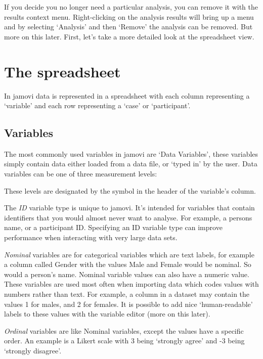 If you decide you no longer need a particular analysis, you can remove it with the results context menu. Right-clicking on the analysis results will bring up a menu and by selecting ‘Analysis’ and then ‘Remove’ the analysis can be removed. But more on this later. First, let's take a more detailed look at the spreadsheet view.


\section{The spreadsheet\label{sec:spreadsheet}}

In jamovi data is represented in a spreadsheet with each column representing a ‘variable’ and each row representing a ‘case’ or ‘participant’.

\subsection{Variables}

The most commonly used variables in jamovi are ‘Data Variables’, these variables simply contain data either loaded from a data file, or ‘typed in’ by the user. Data variables can be one of three measurement levels:

\begin{figure}[ht]
\end{figure}

These levels are designated by the symbol in the header of the variable’s column.

The {\it ID} variable type is unique to jamovi. It’s intended for variables that contain identifiers that you would almost never want to analyse. For example, a persons name, or a participant ID. Specifying an ID variable type can improve performance when interacting with very large data sets.

{\it Nominal} variables are for categorical variables which are text labels, for example a column called Gender with the values Male and Female would be nominal. So would a person’s name. Nominal variable values can also have a numeric value. These variables are used most often when importing data which codes values with numbers rather than text. For example, a column in a dataset may contain the values 1 for males, and 2 for females. It is possible to add nice ‘human-readable’ labels to these values with the variable editor (more on this later).

{\it Ordinal} variables are like Nominal variables, except the values have a specific order. An example is a Likert scale with 3 being ‘strongly agree’ and -3 being ‘strongly disagree’.


